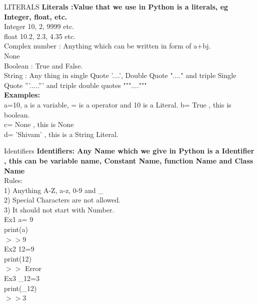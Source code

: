 \documentclass[aspectratio=169, 10pt]{beamer}
\begin{document}
\begin{frame}[t]{LITERALS}
\textbf{Literals :Value that we use in Python is a literals, eg Integer, float, etc.}\\
\vspace{0.5 cm}
Integer 10, 2, 9999 etc.\\
float 10.2, 2.3, 4.35 etc.\\
Complex number : Anything which can be written in form of a+bj.\\
None \\
Boolean : True and False.\\
String : Any thing in single Quote '....', Double Quote "...." and triple Single Quote '''.....''' and triple double quotes """...."""\\
\vspace{0.5 cm}
\textbf{Examples:}\\
a=10, a is a variable, = is a operator and 10 is a Literal.
b= True , this is boolean.\\
c= None , this is None\\
d= 'Shivam' , this is a String Literal.\\ 
\end{frame}

\begin{frame}[t]{Identifiers}
\textbf{Identifiers: Any Name which we give in Python is a Identifier , this can be variable name, Constant Name, function Name and Class Name}\\
\vspace{0.5 cm}
Rules:\\
1) Anything A-Z, a-z, 0-9 and \_\\
2) Special Characters are not allowed.\\
3) It should not start with Number.\\ 

Ex1 
a= 9\\
print(a)\\
$>>$9\\
Ex2 
12=9\\
print(12)\\
$>>$ Error\\
Ex3
\_12=3\\
print(\_12)\\
$>>$3\\
\end{frame}
\end{document}
